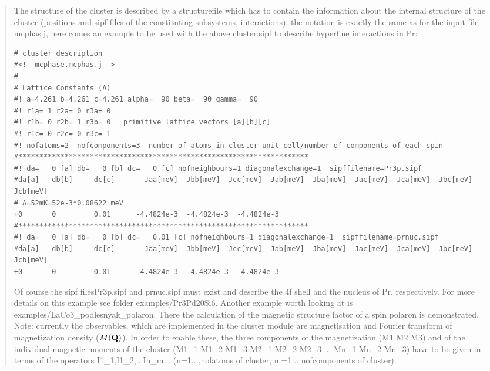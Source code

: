 \begin{quote}
The structure of the cluster is described by a structurefile which has
to contain the information about the internal structure of the cluster
(positions and sipf files of the constituting subsystems, interactions),
the notation is exactly the same as for the input file {\prg mcphas.j},
here comes an example to be used with the above {\prg cluster.sipf} to describe
hyperfine interactions in Pr:
\begin{verbatim}
# cluster description
#<!--mcphase.mcphas.j-->
#
# Lattice Constants (A)
#! a=4.261 b=4.261 c=4.261 alpha=  90 beta=  90 gamma=  90
#! r1a= 1 r2a= 0 r3a= 0
#! r1b= 0 r2b= 1 r3b= 0   primitive lattice vectors [a][b][c]
#! r1c= 0 r2c= 0 r3c= 1
#! nofatoms=2  nofcomponents=3  number of atoms in cluster unit cell/number of components of each spin
#*********************************************************************
#! da=   0 [a] db=   0 [b] dc=   0 [c] nofneighbours=1 diagonalexchange=1  sipffilename=Pr3p.sipf
#da[a]   db[b]     dc[c]       Jaa[meV]  Jbb[meV]  Jcc[meV]  Jab[meV]  Jba[meV]  Jac[meV]  Jca[meV]  Jbc[meV]  Jcb[meV]
# A=52mK=52e-3*0.08622 meV
+0       0         0.01      -4.4824e-3  -4.4824e-3  -4.4824e-3
#*********************************************************************
#! da=   0 [a] db=   0 [b] dc=   0.01 [c] nofneighbours=1 diagonalexchange=1  sipffilename=prnuc.sipf
#da[a]   db[b]     dc[c]       Jaa[meV]  Jbb[meV]  Jcc[meV]  Jab[meV]  Jba[meV]  Jac[meV]  Jca[meV]  Jbc[meV]  Jcb[meV]
+0       0        -0.01      -4.4824e-3  -4.4824e-3  -4.4824e-3
\end{verbatim}
Of course the sipf files{\prg Pr3p.sipf }and {\prg prnuc.sipf} must exist and describe
the 4f shell and the nucleus of Pr, respectively. For more details on this
example see folder {\prg examples/Pr3Pd20Si6}. Another example worth looking
at is {\prg examples/LaCo3\_podlesnyak\_polaron}. There the calculation of the 
magnetic structure factor of a spin polaron is demonstrated.
Note: currently the observables, which are implemented in the cluster module are 
magnetisation and Fourier transform of magnetization density ($M(\mathbf Q)$).
In order to enable these, the three components of the magnetization (M1 M2 M3) and of the 
individual magnetic moments of the cluster (M1\_1 M1\_2 M1\_3 M2\_1 M2\_2 M2\_3 ... Mn\_1 Mn\_2 Mn\_3)
have to be given in terms of the operators I1\_1,I1\_2,...In\_m... (n=1,..,nofatoms of cluster,
m=1... nofcomponents of cluster). 


\end{quote}
